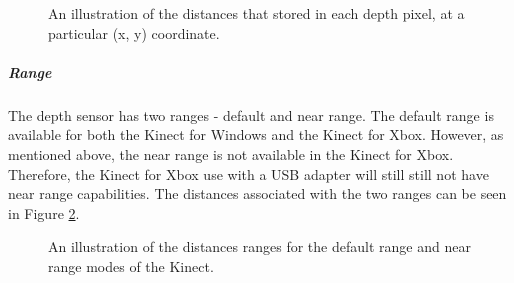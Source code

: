 \begin{figure}[ht]
	\centering
	{%
		\setlength{\fboxsep}{0pt}%
		\setlength{\fboxrule}{0.5pt}%
		}
	\caption{An illustration of the distances that stored in each depth pixel, at a particular (x, y) coordinate. \cite{msdnDepthCamKinect2017}}
	\label{fig:distanceToDepthSpace}
\end{figure}

\subparagraph{Range} \label{depthRange}
The depth sensor has two ranges - default and near range. The default range is available for both the Kinect for Windows and the Kinect for Xbox. However, as mentioned above, the near range is not available in the Kinect for Xbox. Therefore, the Kinect for Xbox use with a USB adapter will still still not have near range capabilities. The distances associated with the two ranges can be seen in Figure \ref{fig:depthSensorRanges}.

\begin{figure}[ht]
	\centering
	{%
		\setlength{\fboxsep}{0pt}%
		\setlength{\fboxrule}{0.5pt}%
		}
	\caption{An illustration of the distances ranges for the default range and near range modes of the Kinect. \cite{msdnCoSpaces2017}}
	\label{fig:depthSensorRanges}
\end{figure}

